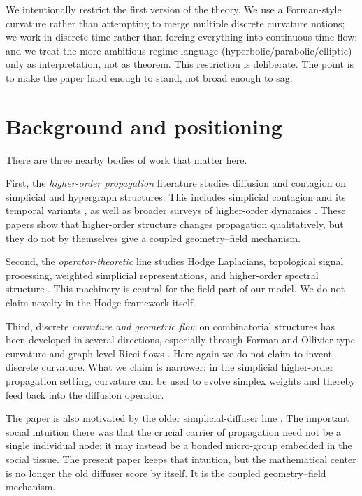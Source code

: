 \documentclass[11pt]{article}
\begin{document}
We intentionally restrict the first version of the theory. We use a Forman-style curvature rather than attempting to merge multiple discrete curvature notions; we work in discrete time rather than forcing everything into continuous-time flow; and we treat the more ambitious regime-language (hyperbolic/parabolic/elliptic) only as interpretation, not as theorem. This restriction is deliberate. The point is to make the paper hard enough to stand, not broad enough to sag.

\section{Background and positioning}

There are three nearby bodies of work that matter here.

First, the \emph{higher-order propagation} literature studies diffusion and contagion on simplicial and hypergraph structures. This includes simplicial contagion and its temporal variants \cite{IacopiniPetriBarratLatora2019,ChowdharyDellaRossaTumminelloBattistonLatora2021}, as well as broader surveys of higher-order dynamics \cite{BattistonCencettiIacopiniEtAl2020,BattistonLucasCencettiEtAl2023}. These papers show that higher-order structure changes propagation qualitatively, but they do not by themselves give a coupled geometry--field mechanism.

Second, the \emph{operator-theoretic} line studies Hodge Laplacians, topological signal processing, weighted simplicial representations, and higher-order spectral structure \cite{BarbarossaSardellitti2020,TorresBianconi2020,BacciniGeraciBianconi2022,KrishnagopalBianconi2021,GongHighamZygalakisBianconi2024}. This machinery is central for the field part of our model. We do not claim novelty in the Hodge framework itself.

Third, discrete \emph{curvature and geometric flow} on combinatorial structures has been developed in several directions, especially through Forman and Ollivier type curvature and graph-level Ricci flows \cite{Forman2003,SreejithJostSaucanSamal2016,SamalEtAl2018,WeberSaucanJost2017,NiLinLuoGao2019}. Here again we do not claim to invent discrete curvature. What we claim is narrower: in the simplicial higher-order propagation setting, curvature can be used to evolve simplex weights and thereby feed back into the diffusion operator.

The paper is also motivated by the older simplicial-diffuser line \cite{KeeSparksStruppaManucciDamiano2016,KeeStruppaManucciDamiano2015}. The important social intuition there was that the crucial carrier of propagation need not be a single individual node; it may instead be a bonded micro-group embedded in the social tissue. The present paper keeps that intuition, but the mathematical center is no longer the old diffuser score by itself. It is the coupled geometry--field mechanism.
\end{document}
